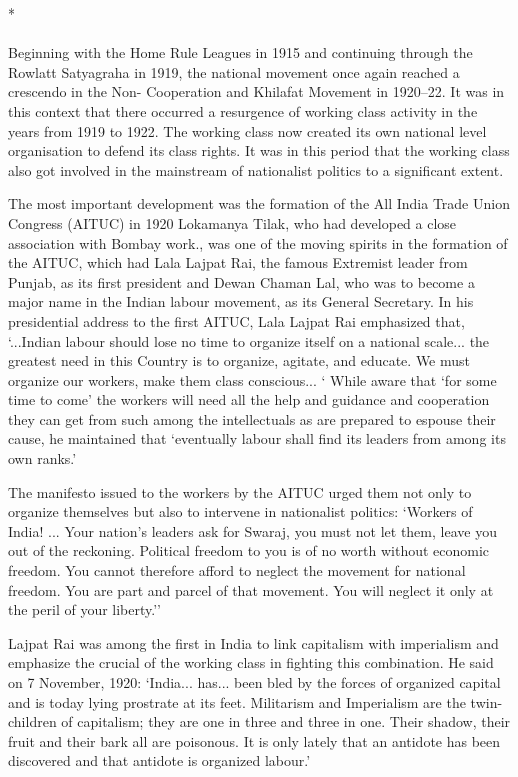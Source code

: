 \begin{center}*\end{center}

\paragraph*{}

Beginning with the Home Rule Leagues in 1915 and continuing through the Rowlatt Satyagraha in 1919, the national movement once again reached a crescendo in the Non- Cooperation and Khilafat Movement in 1920--22. It was in this context that there occurred a resurgence of working class activity in the years from 1919 to 1922. The working class now created its own national level organisation to defend its class rights. It was in this period that the working class also got involved in the mainstream of nationalist politics to a significant extent.

The most important development was the formation of the All India Trade Union Congress (AITUC) in 1920 Lokamanya Tilak, who had developed a close association with Bombay work., was one of the moving spirits in the formation of the AITUC, which had Lala Lajpat Rai, the famous Extremist leader from Punjab, as its first president and Dewan Chaman Lal, who was to become a major name in the Indian labour movement, as its General Secretary. In his presidential address to the first AITUC, Lala Lajpat Rai emphasized that, `...Indian labour should lose no time to organize itself on a national scale... the greatest need in this Country is to organize, agitate, and educate. We must organize our workers, make them class conscious... ` While aware that `for some time to come' the workers will need all the help and guidance and cooperation they can get from such among the intellectuals as are prepared to espouse their cause, he maintained that `eventually labour shall find its leaders from among its own ranks.'

The manifesto issued to the workers by the AITUC urged them not only to organize themselves but also to intervene in nationalist politics: `Workers of India! ... Your nation's leaders ask for Swaraj, you must not let them, leave you out of the reckoning. Political freedom to you is of no worth without economic freedom. You cannot therefore afford to neglect the movement for national freedom. You are part and parcel of that movement. You will neglect it only at the peril of your liberty.''

Lajpat Rai was among the first in India to link capitalism with imperialism and emphasize the crucial of the working class in fighting this combination. He said on 7 November, 1920: `India... has... been bled by the forces of organized capital and is today lying prostrate at its feet. Militarism and Imperialism are the twin-children of capitalism; they are one in three and three in one. Their shadow, their fruit and their bark all are poisonous. It is only lately that an antidote has been discovered and that antidote is organized labour.'

